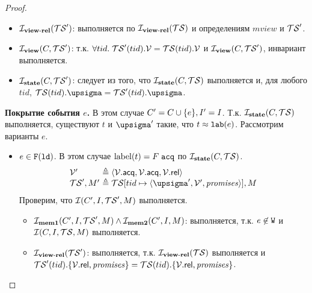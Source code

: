 \begin{proof}
\begin{itemize}
        \item $\mathcal{I}_{\rm \bf view\text{-}rel}(\mathcal{TS}')$: выполняется по $\mathcal{I}_{\rm \bf view\text{-}rel}(\mathcal{TS})$ и определениям $mview$ и $\mathcal{TS}'$.

        \item $\mathcal{I}_{\rm \bf view}(C, \mathcal{TS}')$: т.к. $\forall tid. \; \mathcal{TS}'(tid).\mathcal{V} = \mathcal{TS}(tid).\mathcal{V}$ и $\mathcal{I}_{\rm \bf view}(C, \mathcal{TS}')$,
          инвариант выполняется.

        \item $\mathcal{I}_{\rm \bf state}(C, \mathcal{TS}')$:
          следует из того, что $\mathcal{I}_{\rm \bf state}(C, \mathcal{TS})$ выполняется и, для любого $tid$, $\TSf(tid).\pstate = \TSf'(tid).\pstate$.
      \end{itemize}

  
  {\bf Покрытие события $e$.} В этом случае $C' = C \cup \{e\}, I' = I$.
      Т.к. $\mathcal{I}_{\rm \bf state}(C, \mathcal{TS})$ выполняется, существуют $t$ и $\pstate'$ такие, что $t \approx {\mathtt{lab}}(e)$.
      Рассмотрим варианты $e$.
      \begin{itemize}
        \item $e \in {{\mathtt{F}}}(\mathtt{ld})$.
          В этом случае ${\rm label}(t) = F \; {\mathtt{acq}}$ по $\mathcal{I}_{\rm \bf state}(C, \mathcal{TS})$.
          \[\begin{array}{l@{~}l}
            \View'    & \defeq \tup{\View.\viewAcq, \View.\viewAcq, \View.\viewRel} \\
            \TSf', M' & \defeq \TSf[tid \mapsto \tup{\pstate', \View', \PromSet}], M \\
          \end{array}\]
      Проверим, что $\mathcal{I}(C', I, \mathcal{TS}', M)$ выполняется.
      \begin{itemize}
        \item $\mathcal{I}_{\rm \bf mem1}(C', I, \mathcal{TS}', M) \land \mathcal{I}_{\rm \bf mem2}(C', I, M)$:
          выполняется, т.к. $e \not\in {\mathtt{W}}$ и $\mathcal{I}(C, I, \mathcal{TS}, M)$ выполняется.

        \item $\mathcal{I}_{\rm \bf view\text{-}rel}(\mathcal{TS}')$: выполняется, т.к. $\mathcal{I}_{\rm \bf view\text{-}rel}(\mathcal{TS})$ выполняется и\\
          $\mathcal{TS}'(tid).\{\mathcal{V}.{\sf rel}, \mathit{promises}\} = \mathcal{TS}(tid).\{\mathcal{V}.{\sf rel}, \mathit{promises}\}$.


\end{itemize}
\end{itemize}
\end{proof}
